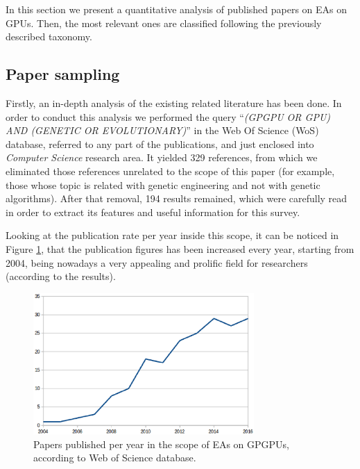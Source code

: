 \documentclass{article}
\begin{document}
In this section we present a quantitative analysis of published papers
on EAs on GPUs. Then, the most relevant ones are classified following
the previously described taxonomy.

\subsection{Paper sampling} %

Firstly, an in-depth analysis of the existing related literature has been done. In order to conduct this analysis we performed the query ``\textit{(GPGPU OR GPU) AND (GENETIC OR EVOLUTIONARY)}'' in the Web Of Science (WoS) \cite{wos} database, referred to any part of the publications, and just enclosed into {\em Computer Science} research area.
It yielded 329 references, from which we eliminated those references unrelated to the scope of this paper (for example, those whose topic is related with genetic engineering and not with genetic algorithms). After that removal, 194 results remained, which were carefully read in order to extract its features and useful information for this survey.

Looking at the publication rate per year inside this scope, it can be noticed in Figure \ref{figure:publications}, that the publication figures has been increased every year, starting from 2004, being nowadays a very appealing and prolific field for researchers  (according to the results).

\begin{figure}[!ht]
\centering
\includegraphics[width=0.75\textwidth]{years.eps}
\caption{Papers published per year in the scope of EAs on GPGPUs, according to Web of Science database.}
\label{figure:publications}
\end{figure}
\end{document}
